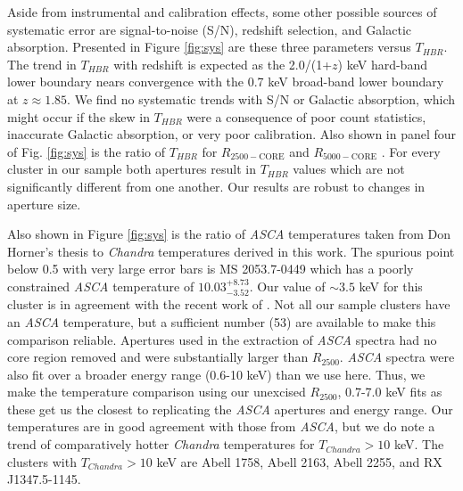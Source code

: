 \documentclass{emulateapj}
\newcommand{\rtwf}{$R_{2500-\text{CORE}}$ }
\newcommand{\rfif}{$R_{5000-\text{CORE}}$ }
\begin{document}

Aside from instrumental and calibration effects, some other possible
sources of systematic error are signal-to-noise (S/N), redshift
selection, and Galactic absorption. Presented in Figure \ref{fig:sys}
are these three parameters versus $T_{HBR}$. The trend in $T_{HBR}$ with redshift
is expected as the 2.0/(1+$z$) keV hard-band lower boundary nears
convergence with the 0.7 keV broad-band lower boundary at
$z \approx 1.85$. We find no systematic trends with S/N or Galactic
absorption, which might occur if the skew in $T_{HBR}$ were a consequence of
poor count statistics, inaccurate Galactic absorption, or very poor
calibration. Also shown in panel four of Fig. \ref{fig:sys} is the
ratio of $T_{HBR}$ for \rtwf and \rfif. For every cluster in our
sample both apertures result in $T_{HBR}$ values which are not significantly
different from one another. Our results are robust to changes in
aperture size.

Also shown in Figure \ref{fig:sys} is the ratio of {\it ASCA}
temperatures taken from Don Horner's thesis to {\it Chandra}
temperatures derived in this work. The spurious point below 0.5 with
very large error bars is MS 2053.7-0449 which has a poorly
constrained {\it ASCA} temperature of $10.03^{+8.73}_{-3.52}$. Our value of
$\sim 3.5$ keV for this cluster is in agreement with the recent work of
\cite{2007astro.ph..3156M}. Not all our sample clusters have an {\it ASCA}
temperature, but a sufficient number (53) are available to make this
comparison reliable. Apertures used in the extraction of {\it ASCA} spectra
had no core region removed and were substantially larger than
$R_{2500}$. {\it ASCA} spectra were also fit over a broader energy range
(0.6-10 keV) than we use here. Thus, we make the temperature
comparison using our unexcised $R_{2500}$, 0.7-7.0 keV fits as
these get us the closest to replicating the {\it ASCA} apertures and energy
range. Our temperatures are in good agreement with those from {\it ASCA},
but we do note a trend of comparatively hotter {\it Chandra} temperatures for
$T_{Chandra} > 10$ keV. The clusters with $T_{Chandra} > 10$ keV are
Abell 1758, Abell 2163, Abell 2255, and RX J1347.5-1145.
\end{document}

